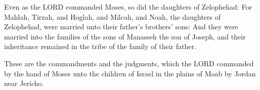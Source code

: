 \verse Even as the LORD commanded Moses, so did the daughters of
Zelophehad: \verse For Mahlah, Tirzah, and Hoglah, and Milcah, and
Noah, the daughters of Zelophehad, were married unto their father's
brothers' sons: \verse And they were married into the families of the
sons of Manasseh the son of Joseph, and their inheritance remained in
the tribe of the family of their father.

\verse These are the commandments and the judgments, which the LORD
commanded by the hand of Moses unto the children of Israel in the
plains of Moab by Jordan near Jericho.

